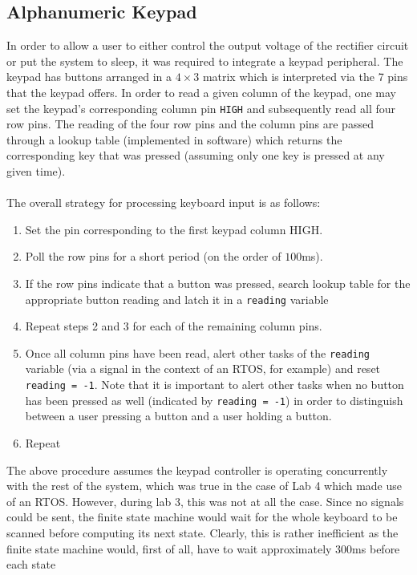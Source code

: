 \documentclass[12pt]{report}
\begin{document}
\subsection{Alphanumeric Keypad}
In order to allow a user to either control the output voltage of the rectifier circuit or put the
system to sleep, it was required to integrate a keypad peripheral. The keypad has buttons arranged
in a $4\times 3$ matrix which is interpreted via the 7 pins that the keypad offers. In order to read
a given column of the keypad, one may set the keypad's corresponding column pin \texttt{HIGH} and
subsequently read all four row pins. The reading of the four row pins and the column pins are passed
through a lookup table (implemented in software) which returns the corresponding key that was
pressed (assuming only one key is pressed at any given time).\\\\
The overall strategy for processing keyboard input is as follows:
\begin{enumerate}
	\item Set the pin corresponding to the first keypad column HIGH.
	\item Poll the row pins for a short period (on the order of $100$ms).
	\item If the row pins indicate that a button was pressed, search lookup table for the
		appropriate button reading and latch it in a \texttt{reading} variable
	\item Repeat steps 2 and 3 for each of the remaining column pins.
	\item Once all column pins have been read, alert other tasks of the \texttt{reading} variable
		(via a signal in the context of an RTOS, for example) and reset \texttt{reading = -1}.
		Note that it is important to alert other tasks when no button has been pressed as well
		(indicated by \texttt{reading = -1}) in order to distinguish between a user pressing a
		button and a user holding a button.
	\item Repeat
\end{enumerate}
The above procedure assumes the keypad controller is operating concurrently with the rest of the
system, which was true in the case of Lab 4 which made use of an RTOS. However, during lab 3, this
was not at all the case. Since no signals could be sent, the finite state machine would wait for the
whole keyboard to be scanned before computing its next state. Clearly, this is rather inefficient as
the finite state machine would, first of all, have to wait approximately 300ms before each state
\end{document}
